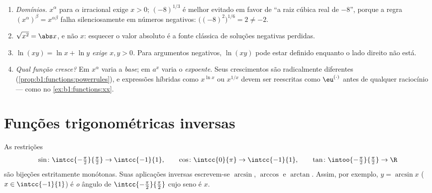 \begin{remark}\label{rem:b1:functions:pitfalls}
\begin{enumerate}
  \item \emph{Domínios.} $x^\alpha$ para $\alpha$ irracional exige
        $x > 0$; $(-8)^{1/3}$ é melhor evitado em favor de ``a
        raiz cúbica real de $-8$'', porque a regra
        $(x^\alpha)^\beta = x^{\alpha\beta}$ falha silenciosamente em
        números negativos: $\bigl((-8)^2\bigr)^{1/6} = 2 \neq -2$.
  \item \emph{$\sqrt{x^2} = \abs x$}, e não $x$: esquecer o
        valor absoluto é a fonte clássica de soluções negativas
        perdidas.
  \item \emph{$\ln(xy) = \ln x + \ln y$ exige $x, y > 0$.} Para
        argumentos negativos, $\ln(xy)$ pode estar definido enquanto o
        lado direito não está.
  \item \emph{Qual função cresce?} Em $x^\alpha$ varia a
        \emph{base}; em $a^x$ varia o \emph{expoente}.
        Seus crescimentos são radicalmente diferentes
        (\cref{prop:b1:functions:powerrules}), e expressões
        híbridas como $x^{\ln x}$ ou $x^{1/x}$ devem ser
        reescritas como $\eu^{(\cdot)}$ antes de qualquer raciocínio ---
        como no \cref{ex:b1:functions:xx}.
\end{enumerate}
\end{remark}

\section{Funções trigonométricas inversas}

\begin{definition}[$\arcsin$, $\arccos$, $\arctan$]\label{def:b1:functions:arc}
As restrições
\[
\sin \colon \intcc{-\tfrac\pi2}{\tfrac\pi2} \to \intcc{-1}{1},
\qquad
\cos \colon \intcc{0}{\pi} \to \intcc{-1}{1},
\qquad
\tan \colon \intoo{-\tfrac\pi2}{\tfrac\pi2} \to \R
\]
são bijeções estritamente monótonas. Suas aplicações inversas escrevem-se
$\arcsin$, $\arccos$ e
$\arctan$. Assim, por exemplo, $y = \arcsin x$
($x \in \intcc{-1}{1}$) é \emph{o} ângulo de
$\intcc{-\frac\pi2}{\frac\pi2}$ cujo seno é $x$.
\end{definition}

